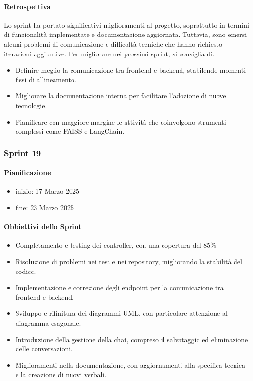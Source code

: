\documentclass{article}
\begin{document}
            \paragraph{Retrospettiva}
            Lo sprint ha portato significativi miglioramenti al progetto, soprattutto in termini di funzionalità implementate e documentazione aggiornata. Tuttavia, sono emersi alcuni problemi di comunicazione e difficoltà tecniche che hanno richiesto iterazioni aggiuntive. Per migliorare nei prossimi sprint, si consiglia di:
            \begin{itemize}
                \item Definire meglio la comunicazione tra frontend e backend, stabilendo momenti fissi di allineamento.
                \item Migliorare la documentazione interna per facilitare l’adozione di nuove tecnologie.
                \item Pianificare con maggiore margine le attività che coinvolgono strumenti complessi come FAISS e LangChain.
            \end{itemize}
                
            \subsubsection{Sprint 19}
            \paragraph{Pianificazione}
                \begin{itemize}
                    \item inizio: 17 Marzo 2025
                    \item fine: 23 Marzo 2025
                \end{itemize}
        
            \paragraph{Obbiettivi dello Sprint}
            \begin{itemize}
                \item Completamento e testing dei controller, con una copertura del 85\%.
                \item Risoluzione di problemi nei test e nei repository, migliorando la stabilità del codice.
                \item Implementazione e correzione degli endpoint per la comunicazione tra frontend e backend.
                \item Sviluppo e rifinitura dei diagrammi UML, con particolare attenzione al diagramma esagonale.
                \item Introduzione della gestione della chat, compreso il salvataggio ed eliminazione delle conversazioni.
                \item Miglioramenti nella documentazione, con aggiornamenti alla specifica tecnica e la creazione di nuovi verbali.
            \end{itemize}
            
\end{document}
